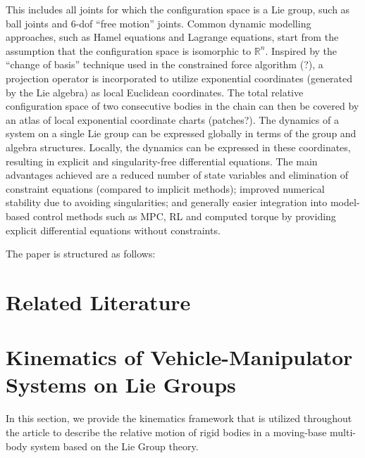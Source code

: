 \documentclass[lettersize,journal]{IEEEtran}
\def \R  {\mathbb{R}}
\theoremstyle{remark}
\begin{document}
This includes all joints for which the configuration space is a Lie group, such as ball joints and 6-dof “free
motion” joints. Common dynamic modelling approaches, such as Hamel equations and Lagrange equations, start from the assumption that the configuration space is isomorphic to $\R^n$. Inspired by the “change of basis” technique used in the constrained force algorithm \cite{}(?), a projection operator is incorporated to utilize exponential coordinates (generated by the Lie algebra) as local Euclidean coordinates. The total relative configuration space of two consecutive bodies in the chain can then be covered by an atlas of local exponential coordinate charts (patches?). The dynamics of a system on a single Lie group can be expressed globally in terms of the group and algebra structures. Locally, the dynamics can be expressed in these coordinates, resulting in explicit and
singularity-free differential equations. The main advantages achieved are a reduced number of state variables and elimination of constraint equations (compared to implicit methods); improved numerical stability due to avoiding singularities; and generally easier integration into model-based control methods such as MPC, RL and computed torque by providing explicit differential equations without constraints. 

The paper is structured as follows:


\section{Related Literature}
\label{chap:MainBackground}


\section{Kinematics of Vehicle-Manipulator Systems on Lie Groups}
\label{math} %
In this section, we provide the kinematics framework that is utilized throughout the article to describe the relative motion of rigid bodies in a moving-base multi-body system based on the Lie Group theory. 
\end{document}
